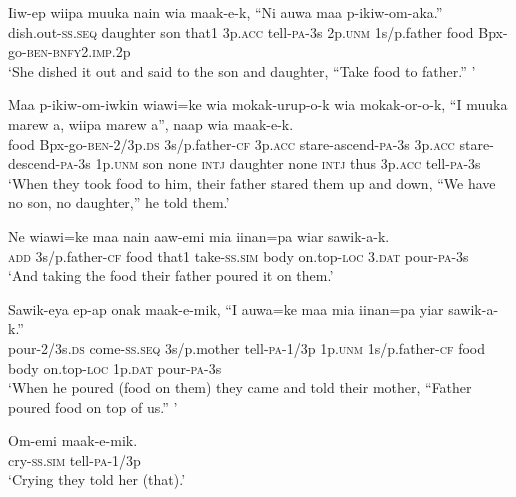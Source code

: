\ea
\gll  Iiw-ep  wiipa  muuka  nain  wia  maak-e-k,  “Ni              auwa  maa  p-ikiw-om-aka.” \\
dish.out-\textsc{ss.seq}  daughter  son  that1  3p.\textsc{acc}  tell-\textsc{pa}-3s  2p.\textsc{unm}  1s/p.father  food  Bpx-go-\textsc{ben}-\textsc{bnfy}2.\textsc{imp}.2p \\


\glt ‘She dished it out and said to the son and daughter, “Take food to father.” ’ \\
\z


\ea
\gll  Maa  p-ikiw-om-iwkin  wiawi=ke  wia  mokak-urup-o-k              wia  mokak-or-o-k,  “I  muuka  marew  a,  wiipa                 marew  a”,  naap  wia  maak-e-k. \\
food  Bpx-go-\textsc{ben}-2/3p.\textsc{ds}  3s/p.father-\textsc{cf}  3p.\textsc{acc}  stare-ascend-\textsc{pa}-3s   3p.\textsc{acc}  stare-descend-\textsc{pa}-3s  1p.\textsc{unm}  son  none  \textsc{intj}  daughter  none  \textsc{intj}  thus  3p.\textsc{acc}  tell-\textsc{pa}-3s \\




\glt ‘When they took food to him, their father stared them up and down, “We have no son, no daughter,” he told them.’ \\
\z


\ea
\gll  Ne  wiawi=ke  maa  nain  aaw-emi  mia  iinan=pa  wiar  sawik-a-k. \\
\textsc{add}  3s/p.father-\textsc{cf}  food  that1  take-\textsc{ss}.\textsc{sim}  body  on.top-\textsc{loc}  3.\textsc{dat}  pour-\textsc{pa}-3s \\
\glt ‘And taking the food their father poured it on them.’ \\
\z


\ea
\gll  Sawik-eya  ep-ap  onak  maak-e-mik,  “I  auwa=ke                         maa  mia  iinan=pa  yiar  sawik-a-k.” \\
pour-2/3s.\textsc{ds}  come-\textsc{ss.seq}  3s/p.mother  tell-\textsc{pa}-1/3p  1p.\textsc{unm}  1s/p.father-\textsc{cf}   food  body  on.top-\textsc{loc}  1p.\textsc{dat}  pour-\textsc{pa}-3s \\


\glt ‘When he poured (food on them) they came and told their mother, “Father poured food on top of us.” ’ \\
\z


\ea
\gll  Om-emi  maak-e-mik. \\
cry-\textsc{ss}.\textsc{sim}  tell-\textsc{pa}-1/3p \\
\glt ‘Crying they told her (that).’ \\
\z


